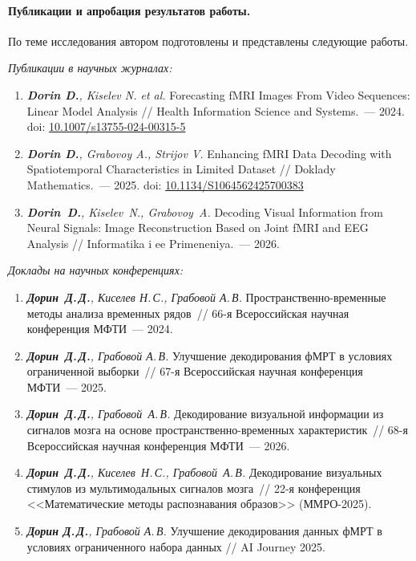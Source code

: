 \paragraph{Публикации и апробация результатов работы.}
По теме исследования автором подготовлены и представлены следующие работы.

\textit{Публикации в научных журналах:}
\begin{enumerate}
    \item \textit{\textbf{Dorin D.}, Kiselev N. et al.} Forecasting fMRI Images From Video Sequences: Linear Model Analysis // Health Information Science and Systems.~--- 2024. doi: \href{https://doi.org/10.1007/s13755-024-00315-5}{10.1007/s13755-024-00315-5}
    \item \textit{\textbf{Dorin D.}, Grabovoy A., Strijov V.} Enhancing fMRI Data Decoding with Spatiotemporal Characteristics in Limited Dataset // Doklady Mathematics.~--- 2025. doi: \href{https://doi.org/10.1134/S1064562425700383}{10.1134/S1064562425700383}
    \item \textit{\textbf{Dorin~D.}, Kiselev~N., Grabovoy~A.} Decoding Visual Information from Neural Signals: Image Reconstruction Based on Joint fMRI and EEG Analysis // Informatika i ee Primeneniya.~--- 2026.
\end{enumerate}

\textit{Доклады на научных конференциях:}
\begin{enumerate}
    \item \textit{\textbf{Дорин~Д.\,Д.}, Киселев Н.\,С., Грабовой А.\,В.} Пространственно-временные методы анализа временных рядов~// 66-я Всероссийская научная конференция МФТИ~--- 2024.

    \item \textit{\textbf{Дорин~Д.\,Д.}, Грабовой А.\,В.} Улучшение декодирования фМРТ в условиях ограниченной выборки~// 67-я Всероссийская научная конференция МФТИ~--- 2025.
    \item \textit{\textbf{Дорин~Д.\,Д.}, Грабовой~А.\,В.} Декодирование визуальной информации из сигналов мозга на основе пространственно-временных характеристик~// 68-я Всероссийская научная конференция МФТИ~--- 2026.
    \item \textit{\textbf{Дорин~Д.\,Д.}, Киселев~Н.\,С., Грабовой~А.\,В.} Декодирование визуальных стимулов из мультимодальных сигналов мозга~// 22-я конференция <<Математические методы распознавания образов>> (ММРО-2025).
    \item \textit{\textbf{Дорин Д.\,Д.}, Грабовой А.\,В.} Улучшение декодирования данных фМРТ в условиях ограниченного набора данных // AI Journey 2025.
\end{enumerate}
